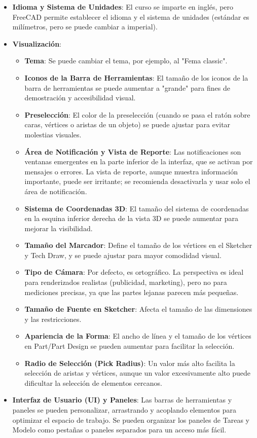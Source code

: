 \documentclass{article}
\begin{document}
\begin{itemize}[noitemsep,topsep=0pt]
    \item \textbf{Idioma y Sistema de Unidades}: El curso se imparte en inglés, pero FreeCAD permite establecer el idioma y el sistema de unidades (estándar es milímetros, pero se puede cambiar a imperial).
    \item \textbf{Visualización}:
    \begin{itemize}[noitemsep,topsep=0pt]
        \item \textbf{Tema}: Se puede cambiar el tema, por ejemplo, al "Fema classic".
        \item \textbf{Iconos de la Barra de Herramientas}: El tamaño de los iconos de la barra de herramientas se puede aumentar a "grande" para fines de demostración y accesibilidad visual.
        \item \textbf{Preselección}: El color de la preselección (cuando se pasa el ratón sobre caras, vértices o aristas de un objeto) se puede ajustar para evitar molestias visuales.
        \item \textbf{Área de Notificación y Vista de Reporte}: Las notificaciones son ventanas emergentes en la parte inferior de la interfaz, que se activan por mensajes o errores. La vista de reporte, aunque muestra información importante, puede ser irritante; se recomienda desactivarla y usar solo el área de notificación.
        \item \textbf{Sistema de Coordenadas 3D}: El tamaño del sistema de coordenadas en la esquina inferior derecha de la vista 3D se puede aumentar para mejorar la visibilidad.
        \item \textbf{Tamaño del Marcador}: Define el tamaño de los vértices en el Sketcher y Tech Draw, y se puede ajustar para mayor comodidad visual.
        \item \textbf{Tipo de Cámara}: Por defecto, es ortográfico. La perspectiva es ideal para renderizados realistas (publicidad, marketing), pero no para mediciones precisas, ya que las partes lejanas parecen más pequeñas.
        \item \textbf{Tamaño de Fuente en Sketcher}: Afecta el tamaño de las dimensiones y las restricciones.
        \item \textbf{Apariencia de la Forma}: El ancho de línea y el tamaño de los vértices en Part/Part Design se pueden aumentar para facilitar la selección.
        \item \textbf{Radio de Selección (Pick Radius)}: Un valor más alto facilita la selección de aristas y vértices, aunque un valor excesivamente alto puede dificultar la selección de elementos cercanos.
    \end{itemize}
    \item \textbf{Interfaz de Usuario (UI) y Paneles}: Las barras de herramientas y paneles se pueden personalizar, arrastrando y acoplando elementos para optimizar el espacio de trabajo. Se pueden organizar los paneles de Tareas y Modelo como pestañas o paneles separados para un acceso más fácil.
\end{itemize}
\end{document}
